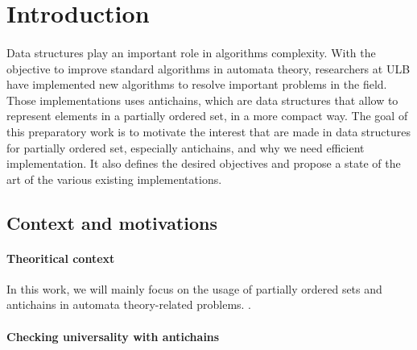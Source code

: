 \documentclass[letterpaper]{article}
\theoremstyle{definition}
\begin{document}
%



\newpage

\tableofcontents

\newpage

\listoftodos

\newpage

\section{Introduction}

\paragraph{}

Data structures play an important role in algorithms complexity.
With the objective to improve standard algorithms in automata theory,
researchers at ULB
have implemented new algorithms to resolve
important problems in the field. Those implementations uses antichains,
which are data structures that allow to represent elements in a partially
ordered set, in a more compact way.
The goal of this preparatory work is to motivate the interest that
are made in data structures for partially ordered set, especially antichains,
and why we need efficient
implementation.
It also defines the desired objectives
and propose a state of the art of the various existing implementations.

\subsection{Context and motivations}

\paragraph{Theoritical context} In this work, we will mainly focus
on the usage of partially ordered sets and antichains in
automata theory-related problems.
.

\paragraph{Checking universality with antichains}
\end{document}
